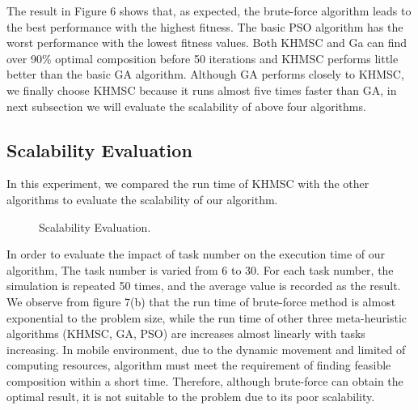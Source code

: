 \documentclass[10pt,journal,compsoc]{IEEEtran}
\begin{document}
The result in Figure 6 shows that, as expected, the brute-force algorithm leads to the best performance with the highest fitness. The basic PSO algorithm has the worst performance with the lowest fitness values. Both KHMSC and Ga can find over 90\% optimal composition before 50 iterations and KHMSC performs little better than the basic GA algorithm. Although GA performs closely to KHMSC, we finally choose KHMSC because it runs almost five times faster than GA, in next subsection we will evaluate the scalability of above four algorithms.

\subsection{Scalability Evaluation}
In this experiment, we compared the run time of KHMSC with the other algorithms to evaluate the scalability of our algorithm.

\begin{figure}[!t]
\centering
{}
\hfil
{}

\caption{Scalability Evaluation.} \label{fig_sim}
\end{figure}

In order to evaluate the impact of task number on the execution time of our algorithm, The task number is varied from 6 to 30. For each task number, the simulation is repeated 50 times, and the average value is recorded as the result. We observe from figure 7(b) that the run time of brute-force method is almost exponential to the problem size, while the run time of other three meta-heuristic algorithms (KHMSC, GA, PSO) are increases almost linearly with tasks increasing. In mobile environment, due to the dynamic movement and limited of computing resources, algorithm must meet the requirement of finding feasible composition within a short time. Therefore, although brute-force can obtain the optimal result, it is not suitable to the problem due to its poor scalability. 
\end{document}
